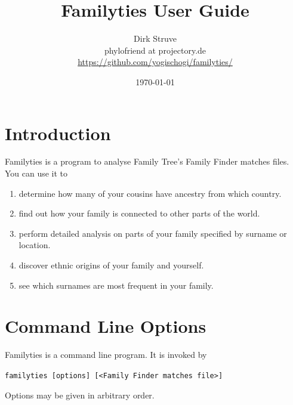 \documentclass[12pt,a4paper]{article}
\begin{document}
\title{Familyties User Guide}
\author{Dirk Struve\\
phylofriend at projectory.de\\
\href{https://github.com/yogischogi/familyties/}{https://github.com/yogischogi/familyties/}}
\date{\today}
\maketitle
\tableofcontents

\section{Introduction}
Familyties is a program to analyse Family Tree's Family Finder
matches files. You can use it to
\begin{enumerate}
\item determine how many of your cousins have ancestry from which
  country.
\item find out how your family is connected to other parts of the
  world.
\item perform detailed analysis on parts of your family specified
  by surname or location.
\item discover ethnic origins of your family and yourself.
\item see which surnames are most frequent in your family.
\end{enumerate}


\section{Command Line Options}

Familyties is a command line program. It is invoked by

\vspace{1em}
\noindent\texttt{familyties [options] [<Family Finder matches file>]}

\vspace{1em}
\noindent Options may be given in arbitrary order.
\end{document}
